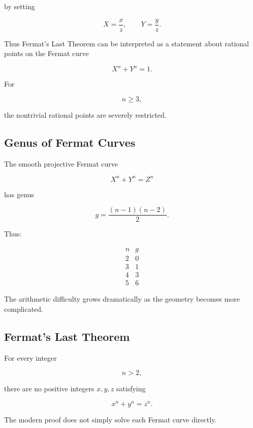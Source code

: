 by setting

\[ X=\frac{x}{z},\qquad Y=\frac{y}{z}. \]

Thus Fermat's Last Theorem can be interpreted as a statement about rational
points on the Fermat curve

\[ \boxed{X^n+Y^n=1.} \]

For

\[ n\geq3, \]

the nontrivial rational points are severely restricted.

\subsection{Genus of Fermat Curves}
\label{subsec:fermat-curve-genus}

The smooth projective Fermat curve

\[ X^n+Y^n=Z^n \]

has genus

\[ \boxed{g=\frac{(n-1)(n-2)}2.} \]

Thus:

\[
\begin{array}{c|c}
n & g\\
\hline
2 & 0\\
3 & 1\\
4 & 3\\
5 & 6
\end{array}
\]

The arithmetic difficulty grows dramatically as the geometry becomes more
complicated.

\subsection{Fermat's Last Theorem}
\label{subsec:fermat-last-theorem-geometry}

\begin{theorem}
For every integer

\[ n>2, \]

there are no positive integers \(x,y,z\) satisfying

\[ \boxed{x^n+y^n=z^n.} \]
\end{theorem}

The modern proof does not simply solve each Fermat curve directly.

